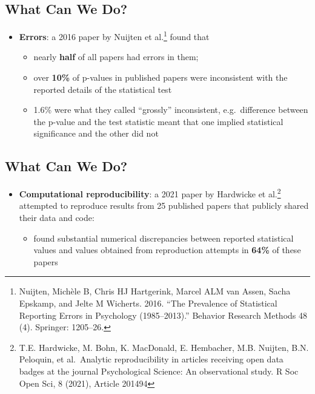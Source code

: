 \documentclass[
  letterpaper,
  DIV=11,
  numbers=noendperiod]{scrartcl}
\providecommand{\tightlist}{%
  \setlength{\itemsep}{0pt}\setlength{\parskip}{0pt}}\usepackage{longtable,booktabs,array}
\begin{document}
\subsection{What Can We Do?}\label{what-can-we-do-1}

\begin{itemize}
\tightlist
\item
  \textbf{Errors}: a 2016 paper by Nuijten et al.\footnote{Nuijten,
    Michèle B, Chris HJ Hartgerink, Marcel ALM van Assen, Sacha Epskamp,
    and Jelte M Wicherts. 2016. ``The Prevalence of Statistical
    Reporting Errors in Psychology (1985--2013).'' Behavior Research
    Methods 48 (4). Springer: 1205--26.} found that

  \begin{itemize}
  \tightlist
  \item
    nearly \textbf{half} of all papers had errors in them;
  \item
    over \textbf{10\%} of p-values in published papers were inconsistent
    with the reported details of the statistical test
  \item
    1.6\% were what they called ``grossly'' inconsistent,
    e.g.~difference between the p-value and the test statistic meant
    that one implied statistical significance and the other did not
  \end{itemize}
\end{itemize}

\subsection{What Can We Do?}\label{what-can-we-do-2}

\begin{itemize}
\tightlist
\item
  \textbf{Computational reproducibility}: a 2021 paper by Hardwicke et
  al.\footnote{T.E. Hardwicke, M. Bohn, K. MacDonald, E. Hembacher, M.B.
    Nuijten, B.N. Peloquin, et al.~Analytic reproducibility in articles
    receiving open data badges at the journal Psychological Science: An
    observational study. R Soc Open Sci, 8 (2021), Article 201494}
  attempted to reproduce results from 25 published papers that publicly
  shared their data and code:

  \begin{itemize}
  \tightlist
  \item
    found substantial numerical discrepancies between reported
    statistical values and values obtained from reproduction attempts in
    \textbf{64\%} of these papers
  \end{itemize}
\end{itemize}
\end{document}
